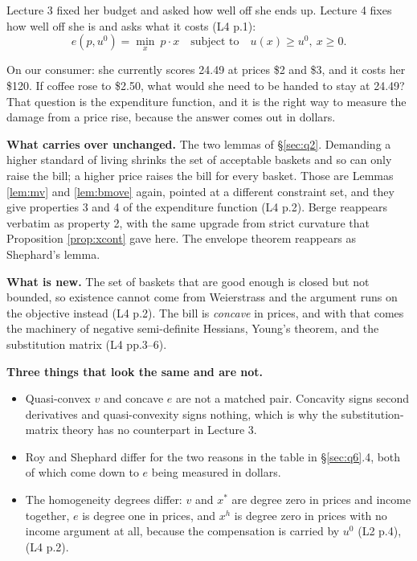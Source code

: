 \documentclass[11pt,letterpaper]{article}
\theoremstyle{definition}
\theoremstyle{plain}
\newcommand{\src}[1]{{\small\textsf{(#1)}}}
\begin{document}
Lecture 3 fixed her budget and asked how well off she ends up. Lecture 4 fixes how well off she is
and asks what it costs \src{L4 p.1}:
\[
e(p, u^0) = \min_x \ p \cdot x \quad \text{subject to} \quad u(x) \ge u^0, \ x \ge 0 .
\]

On our consumer: she currently scores 24.49 at prices \$2 and \$3, and it costs her \$120. If coffee
rose to \$2.50, what would she need to be handed to stay at 24.49? That question is the expenditure
function, and it is the right way to measure the damage from a price rise, because the answer comes
out in dollars.

\textbf{What carries over unchanged.} The two lemmas of \S\ref{sec:q2}. Demanding a higher standard
of living shrinks the set of acceptable baskets and so can only raise the bill; a higher price raises
the bill for every basket. Those are Lemmas \ref{lem:mv} and \ref{lem:bmove} again, pointed at a
different constraint set, and they give properties 3 and 4 of the expenditure function \src{L4 p.2}.
Berge reappears verbatim as property 2, with the same upgrade from strict curvature that Proposition
\ref{prop:xcont} gave here. The envelope theorem reappears as Shephard's lemma.

\textbf{What is new.} The set of baskets that are good enough is closed but not bounded, so existence
cannot come from Weierstrass and the argument runs on the objective instead \src{L4 p.2}. The bill is
\emph{concave} in prices, and with that comes the machinery of negative semi-definite Hessians,
Young's theorem, and the substitution matrix \src{L4 pp.3--6}.

\textbf{Three things that look the same and are not.}

\begin{itemize}
\item Quasi-convex $v$ and concave $e$ are not a matched pair. Concavity signs second derivatives and
quasi-convexity signs nothing, which is why the substitution-matrix theory has no counterpart in
Lecture 3.
\item Roy and Shephard differ for the two reasons in the table in \S\ref{sec:q6}.4, both of which come
down to $e$ being measured in dollars.
\item The homogeneity degrees differ: $v$ and $x^*$ are degree zero in prices and income together,
$e$ is degree one in prices, and $x^h$ is degree zero in prices with no income argument at all,
because the compensation is carried by $u^0$ \src{L2 p.4}, \src{L4 p.2}.
\end{itemize}
\end{document}
